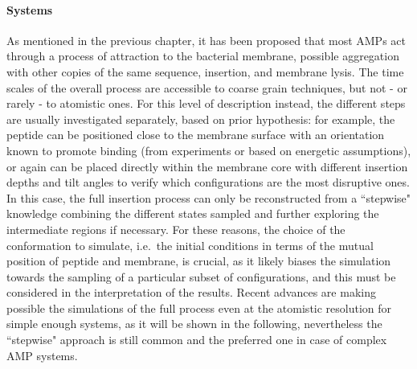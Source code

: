 \paragraph{Systems} As mentioned in the previous chapter, it has been proposed that most AMPs act through a process of attraction to the bacterial membrane, possible aggregation with other copies of the same sequence, insertion, and membrane lysis. The time scales of the overall process are accessible to coarse grain techniques, but not - or rarely - to atomistic ones.
%
For this level of description instead, the different steps are usually investigated separately, based on prior hypothesis: for example, the peptide can be positioned close to the membrane surface with an orientation known to promote binding (from experiments or based on energetic assumptions), or again can be placed directly within the membrane core with different insertion depths and tilt angles to verify which configurations are the most disruptive ones. In this case, the full insertion process can only be reconstructed from a ``stepwise" knowledge combining the different states sampled and further exploring the intermediate regions if necessary.
%
For these reasons, the choice of the conformation to simulate, i.e.\ the initial conditions in terms of the mutual position of peptide and membrane, is crucial, as it likely biases the simulation towards the sampling of a particular subset of configurations, and this must be considered in the interpretation of the results. Recent advances are making possible the simulations of the full process even at the atomistic resolution for simple enough systems, as it will be shown in the following, nevertheless the ``stepwise" approach is still common and the preferred one in case of complex AMP systems.

